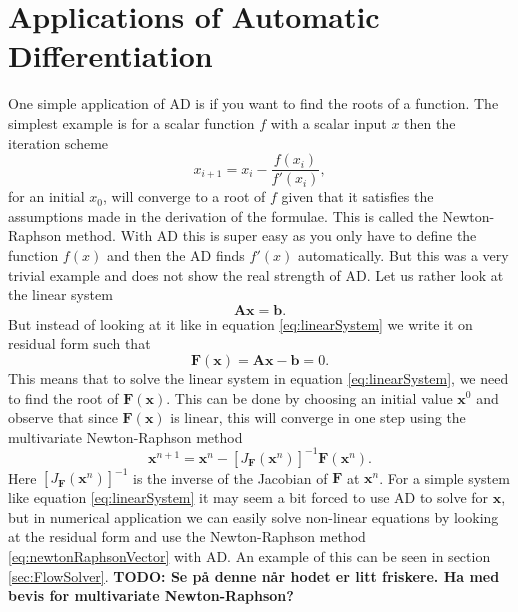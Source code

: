 \section{Applications of Automatic Differentiation}
One simple application of AD is if you want to find the roots of a function. The simplest example is for a scalar function $f$ with a scalar input $x$ then the iteration scheme
\begin{equation*}
    x_{i+1} = x_i - \frac{f(x_i)}{f'(x_i)},
\end{equation*}
for an initial $x_0$, will converge to a root of $f$ given that it satisfies the assumptions made in the derivation of the formulae. This is called the Newton-Raphson method. With AD this is super easy as you only have to define the function $f(x)$ and then the AD finds $f'(x)$ automatically. But this was a very trivial example and does not show the real strength of AD. Let us rather look at the linear system 
\begin{equation}
    \textbf{A}\boldsymbol{x} = \textbf{b}.
    \label{eq:linearSystem}
\end{equation}
But instead of looking at it like in equation \eqref{eq:linearSystem} we write it on residual form such that
\begin{equation*}
	\boldsymbol{F}(\boldsymbol{x}) = \textbf{A}\boldsymbol{x} - \boldsymbol{b} = 0 .
\end{equation*}
This means that to solve the linear system in equation \eqref{eq:linearSystem}, we need to find the root of $\boldsymbol{F}(\boldsymbol{x})$. This can be done by choosing an initial value $\boldsymbol{x}^0$ and observe that since $\boldsymbol{F}(\boldsymbol{x})$ is linear, this will converge in one step using the multivariate Newton-Raphson method
\begin{equation}
	\boldsymbol{x}^{n+1} = \boldsymbol{x}^n - \left[J_{\boldsymbol{F}}  (\boldsymbol{x}^n)\right]^{-1} \boldsymbol{F}(\boldsymbol{x}^n).
    \label{eq:newtonRaphsonVector}
\end{equation}
Here $\left[J_{\boldsymbol{F}}  (\boldsymbol{x}^n)\right]^{-1}$ is the inverse of the Jacobian of $\boldsymbol{F}$ at $\boldsymbol{x}^n$. For a simple system like equation \eqref{eq:linearSystem} it may seem a bit forced to use AD to solve for $\boldsymbol{x}$, but in numerical application we can easily solve non-linear equations by looking at the residual form and use the Newton-Raphson method \eqref{eq:newtonRaphsonVector} with AD. An example of this can be seen in section \ref{sec:FlowSolver}.
\textbf{TODO: Se på denne når hodet er litt friskere. Ha med bevis for multivariate Newton-Raphson?}


